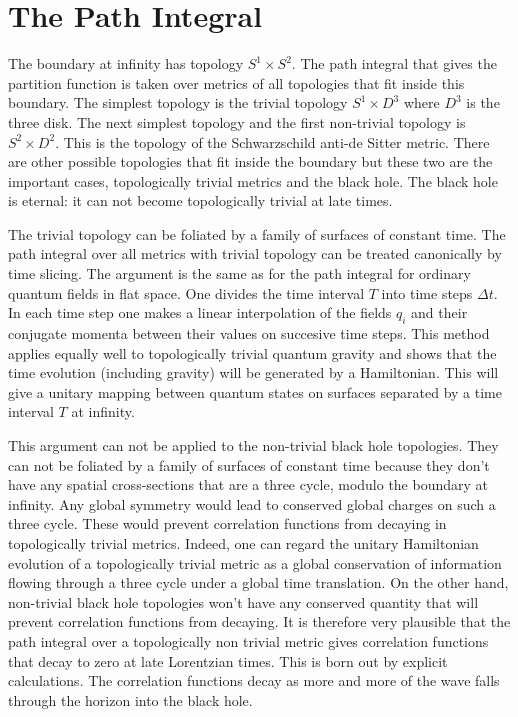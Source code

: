 \documentclass[aps,prd,groupedaddress,showpacs,12pt]{revtex4-1}
\begin{document}
\section{ The Path Integral }

The boundary at infinity has topology $S^1 \times S^2$. The path integral that gives the partition function is taken over metrics of all topologies that fit inside this boundary. The simplest topology is the trivial topology $S^1 \times D^3$ where $D^3$ is the three disk. The next simplest topology and the first non-trivial topology is $S^2 \times D^2$. This is the topology of the Schwarzschild anti-de Sitter metric. There are other possible topologies that fit inside the boundary but these two are the important cases, topologically trivial metrics and the black hole. The black hole is eternal: it can not become topologically trivial at late times.

The trivial topology can be foliated by a family of surfaces of constant time. The path integral over all metrics with trivial topology can be treated canonically by time slicing. The argument is the same as for the path integral for ordinary quantum fields in flat space. One divides the time interval $T$ into time steps $\Delta t$. In each time step one makes a linear interpolation of the fields $q_i$ and their conjugate momenta between their values on succesive time steps. This method applies equally well to topologically trivial quantum gravity and shows that the time evolution (including gravity) will be generated by 
a Hamiltonian. This will give a unitary mapping between quantum states on surfaces separated by a time interval $T$ at infinity. 

This argument can not be applied to the non-trivial black hole topologies. They can not be foliated by a family of surfaces of constant time because they don't have any spatial cross-sections that are a three cycle, modulo the boundary at infinity. Any global symmetry would lead to conserved global charges on such a three cycle. These would prevent correlation functions from decaying in topologically trivial metrics. Indeed, one can regard the unitary Hamiltonian evolution of a topologically trivial metric as a global conservation of information flowing through a three cycle under a global time translation. On the other hand, non-trivial black hole topologies won't have any conserved quantity that will prevent correlation functions from decaying. It is therefore very plausible that the path integral over a topologically non trivial metric gives correlation functions that decay to zero at late Lorentzian times. This is  born out by explicit calculations. The correlation functions decay as more and more of the wave falls through the horizon into the black hole.   
\end{document}
